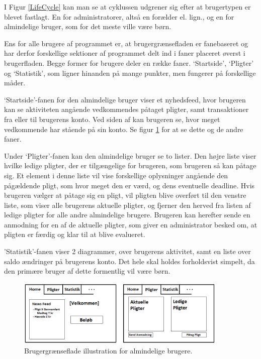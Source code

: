 I Figur \ref{LifeCycle} kan man se at cyklussen udgrener sig efter at brugertypen er blevet fastlagt. En for administratorer, altså en forælder el. lign., og en for almindelige bruger, som for det meste ville være børn.

Ens for alle brugere af programmet er, at brugergrænsefladen er fanebaseret og har derfor forskellige sektioner af programmet delt ind i faner placeret øverst i brugerfladen. Begge former for brugere deler en række faner. ‘Startside’, ‘Pligter’ og ‘Statistik’, som ligner hinanden på mange punkter, men fungerer på forskellige måder.

‘Startside’-fanen for den almindelige bruger viser et nyhedsfeed, hvor brugeren kan se aktiviteten angående vedkommendes påtaget pligter, samt transaktioner fra eller til brugerens konto. Ved siden af kan brugeren se, hvor meget vedkommende har stående på sin konto. Se figur \ref{BarnUI} for at se dette og de andre faner.

Under ‘Pligter’-fanen kan den almindelige bruger se to lister. Den højre liste viser hvilke ledige pligter, der er tilgængelige for brugeren, som brugeren så kan påtage sig. Et element i denne liste vil vise forskellige oplysninger angående den pågældende pligt, som hvor meget den er værd, og dens eventuelle deadline. Hvis brugeren vælger at påtage sig en pligt, vil pligten blive overført til den venstre liste, som viser alle brugerens aktuelle pligter, og fjerner den herved fra listen af ledige pligter for alle andre almindelige brugere. Brugeren kan herefter sende en anmodning for en af de aktuelle pligter, som giver en administrator besked om, at pligten er færdig og klar til at blive evalueret.

'Statistik'-fanen viser 2 diagrammer, over brugerens aktivitet, samt en liste over saldo ændringer på brugerens konto. Det hele skal holdes forholdsvist simpelt, da den primære bruger af dette formentlig vil være børn.

\begin{figure}[H]
\centering
\includegraphics[width=0.9\textwidth]{Billeder/BarnUI.png}
\caption{Brugergrænseflade illustration for almindelige brugere.}
\label{BarnUI}
\end{figure}

